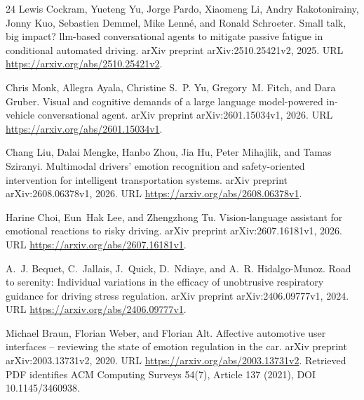 \documentclass[11pt,a4paper]{article}
\begin{document}
\begin{thebibliography}{24}
Lewis Cockram, Yueteng Yu, Jorge Pardo, Xiaomeng Li, Andry Rakotonirainy, Jonny
  Kuo, Sebastien Demmel, Mike Lenné, and Ronald Schroeter.
\newblock Small talk, big impact? llm-based conversational agents to mitigate
  passive fatigue in conditional automated driving.
\newblock arXiv preprint arXiv:2510.25421v2, 2025.
\newblock URL \url{https://arxiv.org/abs/2510.25421v2}.

Chris Monk, Allegra Ayala, Christine S.~P. Yu, Gregory~M. Fitch, and Dara
  Gruber.
\newblock Visual and cognitive demands of a large language model-powered
  in-vehicle conversational agent.
\newblock arXiv preprint arXiv:2601.15034v1, 2026.
\newblock URL \url{https://arxiv.org/abs/2601.15034v1}.

Chang Liu, Dalai Mengke, Hanbo Zhou, Jia Hu, Peter Mihajlik, and Tamas
  Sziranyi.
\newblock Multimodal drivers' emotion recognition and safety-oriented
  intervention for intelligent transportation systems.
\newblock arXiv preprint arXiv:2608.06378v1, 2026.
\newblock URL \url{https://arxiv.org/abs/2608.06378v1}.

Harine Choi, Eun~Hak Lee, and Zhengzhong Tu.
\newblock Vision-language assistant for emotional reactions to risky driving.
\newblock arXiv preprint arXiv:2607.16181v1, 2026.
\newblock URL \url{https://arxiv.org/abs/2607.16181v1}.

A.~J. Bequet, C.~Jallais, J.~Quick, D.~Ndiaye, and A.~R. Hidalgo-Munoz.
\newblock Road to serenity: Individual variations in the efficacy of
  unobtrusive respiratory guidance for driving stress regulation.
\newblock arXiv preprint arXiv:2406.09777v1, 2024.
\newblock URL \url{https://arxiv.org/abs/2406.09777v1}.

Michael Braun, Florian Weber, and Florian Alt.
\newblock Affective automotive user interfaces -- reviewing the state of
  emotion regulation in the car.
\newblock arXiv preprint arXiv:2003.13731v2, 2020{}.
\newblock URL \url{https://arxiv.org/abs/2003.13731v2}.
\newblock Retrieved PDF identifies ACM Computing Surveys 54(7), Article 137
  (2021), DOI 10.1145/3460938.


\end{thebibliography}
\end{document}
